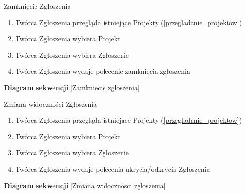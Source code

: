 \begin{usecase}{Zamknięcie Zgłoszenia}
	\begin{enumerate}
    \item Twórca Zgłoszenia przegląda istniejące Projekty (\ref{przegladanie_projektow})
    \item Twórca Zgłoszenia wybiera Projekt
    \item Twórca Zgłoszenia wybiera Zgłoszenie
    \item Twórca Zgłoszenia wydaje polecenie zamknięcia zgłoszenia
    \end{enumerate}
	\parindent=0cm
	\textbf{Diagram sekwencji}
	\ref{Zamkniecie zgloszenia}
\end{usecase}


\begin{usecase}{Zmiana widoczności Zgłoszenia}
	\begin{enumerate}
    \item Twórca Zgłoszenia przegląda istniejące Projekty (\ref{przegladanie_projektow})
    \item Twórca Zgłoszenia wybiera Projekt
    \item Twórca Zgłoszenia wybiera Zgłoszenie
    \item Twórca Zgłoszenia wydaje polecenia ukrycia/odkrycia Zgłoszenia
	\end{enumerate}
	\parindent=0cm
	\textbf{Diagram sekwencji}
	\ref{Zmiana widocznosci zgloszenia}
\end{usecase}


